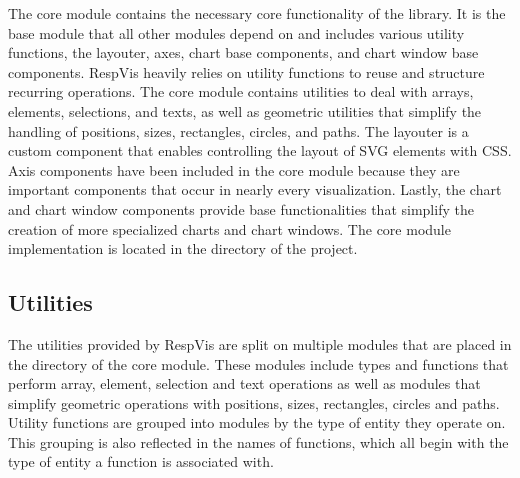 The core module contains the necessary core functionality of the library.
It is the base module that all other modules depend on and includes various utility functions, the layouter, axes, chart base components, and chart window base components.
RespVis heavily relies on utility functions to reuse and structure recurring operations.
The core module contains utilities to deal with arrays, elements, selections, and texts, as well as geometric utilities that simplify the handling of positions, sizes, rectangles, circles, and paths.
The layouter is a custom component that enables controlling the layout of SVG elements with CSS.
Axis components have been included in the core module because they are important components that occur in nearly every visualization.
Lastly, the chart and chart window components provide base functionalities that simplify the creation of more specialized charts and chart windows.
The core module implementation is located in the  directory of the project.

\subsection{Utilities}

The utilities provided by RespVis are split on multiple modules that are placed in the  directory of the core module.
These modules include types and functions that perform array, element, selection and text operations as well as modules that simplify geometric operations with positions, sizes, rectangles, circles and paths.
Utility functions are grouped into modules by the type of entity they operate on.
This grouping is also reflected in the names of functions, which all begin with the type of entity a function is associated with.

